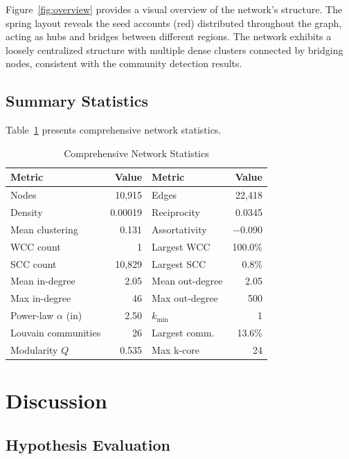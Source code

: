 \documentclass[11pt,a4paper]{article}
\begin{document}
Figure~\ref{fig:overview} provides a visual overview of the network's structure. The spring layout reveals the seed accounts (red) distributed throughout the graph, acting as hubs and bridges between different regions. The network exhibits a loosely centralized structure with multiple dense clusters connected by bridging nodes, consistent with the community detection results.

\subsection{Summary Statistics}

Table~\ref{tab:fullstats} presents comprehensive network statistics.

\begin{table}[H]
    \centering
    \caption{Comprehensive Network Statistics}
    \label{tab:fullstats}
    \begin{tabular}{lrlr}
        \toprule
        Metric & Value & Metric & Value \\
        \midrule
        Nodes & 10,915 & Edges & 22,418 \\
        Density & 0.00019 & Reciprocity & 0.0345 \\
        Mean clustering & 0.131 & Assortativity & $-$0.090 \\
        WCC count & 1 & Largest WCC & 100.0\% \\
        SCC count & 10,829 & Largest SCC & 0.8\% \\
        Mean in-degree & 2.05 & Mean out-degree & 2.05 \\
        Max in-degree & 46 & Max out-degree & 500 \\
        Power-law $\alpha$ (in) & 2.50 & $k_{\min}$ & 1 \\
        Louvain communities & 26 & Largest comm. & 13.6\% \\
        Modularity $Q$ & 0.535 & Max k-core & 24 \\
        \bottomrule
    \end{tabular}
\end{table}

\section{Discussion}

\subsection{Hypothesis Evaluation}
\end{document}
